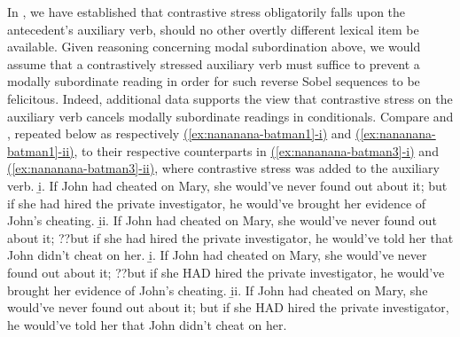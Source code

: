 In , we have established that contrastive stress obligatorily falls upon the antecedent's auxiliary verb, should no other overtly different lexical item be available. Given reasoning concerning modal subordination above, we would assume that a contrastively stressed auxiliary verb must suffice to prevent a modally subordinate reading in order for such reverse Sobel sequences to be felicitous. Indeed, additional data supports the view that contrastive stress on the auxiliary verb cancels modally subordinate readings in conditionals. Compare  and , repeated below as respectively \hyperref[ex:nananana-batman1]{(\ref*{ex:nananana-batman1}-i)} and \hyperref[ex:nananana-batman1]{(\ref*{ex:nananana-batman1}-ii)}, to their respective counterparts in \hyperref[ex:nananana-batman3]{(\ref*{ex:nananana-batman3}-i)} and \hyperref[ex:nananana-batman3]{(\ref*{ex:nananana-batman3}-ii)}, where contrastive stress was added to the auxiliary verb.
\pex{}
{}
\a{} {}\beginsubsub
\b{i.} If John had cheated on Mary, she would've never found out about it; but if she had hired the private investigator, he would've brought her evidence of John's cheating.
\b{ii.} If John had cheated on Mary, she would've never found out about it; {??}but if she had hired the private investigator, he would've told her that John didn't cheat on her.
\endsubsub\pagebreak
\a{} {}\beginsubsub
\b{i.} If John had cheated on Mary, she would've never found out about it; {??}but if she \MakeUppercase{had} hired the private investigator, he would've brought her evidence of John's cheating.
\b{ii.} If John had cheated on Mary, she would've never found out about it; but if she \MakeUppercase{had} hired the private investigator, he would've told her that John didn't cheat on her.
\endsubsub
\xe
